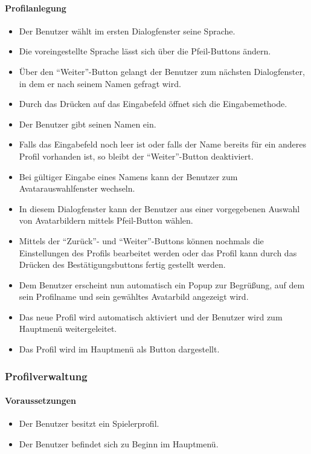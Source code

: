 \paragraph{Profilanlegung}
\begin{itemize}
	\item Der Benutzer wählt im ersten Dialogfenster seine Sprache.
	\item Die voreingestellte Sprache lässt sich über die Pfeil-Buttons ändern.
	\item Über den "`Weiter"'-Button gelangt der Benutzer zum nächsten Dialogfenster, in dem er nach seinem Namen gefragt wird.
	\item Durch das Drücken auf das Eingabefeld öffnet sich die Eingabemethode.
	\item Der Benutzer gibt seinen Namen ein.
	\item Falls das Eingabefeld noch leer ist oder falls der Name bereits für ein anderes Profil vorhanden ist, so bleibt der "`Weiter"'-Button deaktiviert.
	\item Bei gültiger Eingabe eines Namens kann der Benutzer zum Avatarauswahlfenster wechseln.
	\item In diesem Dialogfenster kann der Benutzer aus einer vorgegebenen Auswahl von Avatarbildern mittels Pfeil-Button wählen.
	\item Mittels der "`Zurück"'- und "`Weiter"'-Buttons können nochmals die Einstellungen des Profils bearbeitet werden oder das Profil kann durch das Drücken des Bestätigungsbuttons fertig gestellt werden.
	\item Dem Benutzer erscheint nun automatisch ein Popup zur Begrüßung, auf dem sein Profilname und sein gewähltes Avatarbild angezeigt wird.
	\item Das neue Profil wird automatisch aktiviert und der Benutzer wird zum Hauptmenü weitergeleitet.
	\item Das Profil wird im Hauptmenü als Button dargestellt.
\end{itemize}

\subsubsection{Profilverwaltung}
\paragraph{Voraussetzungen}
\begin{itemize}
	\item Der Benutzer besitzt ein Spielerprofil.
	\item Der Benutzer befindet sich zu Beginn im Hauptmenü.
\end{itemize}
